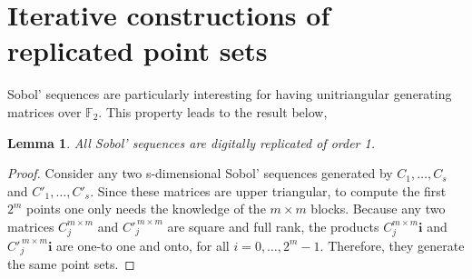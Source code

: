 \documentclass[]{elsarticle}
\newtheorem{lem}{Lemma}
\theoremstyle{definition}
\newtheorem{defin}{Definition}
\newcommand{\bvec}[1]{\boldsymbol{#1}}
\newcommand{\vx}{\bvec{x}}
\newcommand{\vi}{\bvec{i}}
\begin{document}
\section{Iterative constructions of replicated point sets}
\label{sobol.seq.cons}

Sobol' sequences are particularly interesting for having unitriangular generating matrices over $\mathbb{F}_2$. This property leads to the result below,

\begin{lem}\label{Sobol_replicated}
All Sobol' sequences are digitally replicated of order 1.
\end{lem}
\begin{proof}
Consider any two s-dimensional Sobol' sequences generated by $C_1,\dots,C_s$ and $C'_1,\dots,C'_s$. Since these matrices are upper triangular, to compute the first $2^m$ points one only needs the knowledge of the $m\times m$ blocks. Because any two matrices $C^{m\times m}_j$ and $C'^{\,m\times m}_j$ are square and full rank, the products $C^{m\times m}_j\vi$ and $C'^{\,m\times m}_j\vi$ are one-to one and onto, for all $i=0,\dots,2^m-1$. Therefore, they generate the same point sets.
\end{proof}

\end{document}
